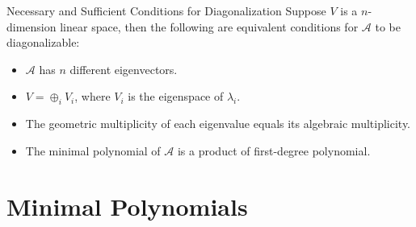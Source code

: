 \begin{proposition}{Necessary and Sufficient Conditions for Diagonalization}{}
  Suppose $V$ is a $n$-dimension linear space,
  then the following are equivalent conditions for $\mathcal{A}$ to be diagonalizable:
  \begin{itemize}
  \item $\mathcal{A}$ has $n$ different eigenvectors.
  \item $V = \oplus_i V_i$, where $V_i$ is the eigenspace of $\lambda_i$.
  \item The geometric multiplicity of each eigenvalue equals its algebraic multiplicity.
  \item The minimal polynomial of $\mathcal{A}$ is a product of first-degree polynomial.
  \end{itemize}
\end{proposition}


\section{Minimal Polynomials}



